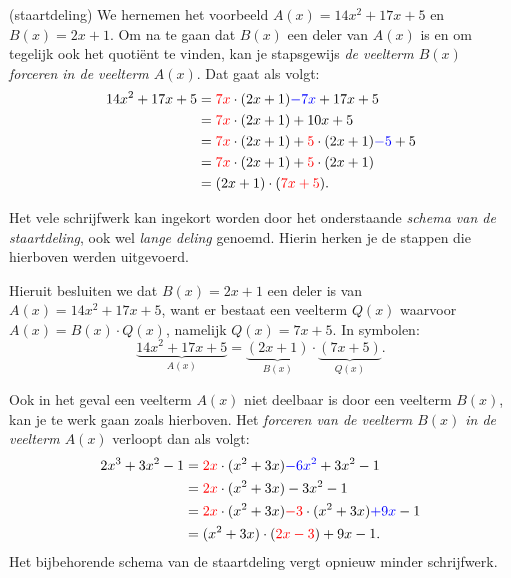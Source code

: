 \documentclass{ximera}
\begin{document}
\begin{algorithm}(staartdeling)
	We hernemen het voorbeeld $A(x) = 14x^2+17x+5$ en $B(x) = 2x+1$. Om na te gaan dat $B(x)$ een deler van $A(x)$ is en om tegelijk ook het quotiënt te vinden, kan je stapsgewijs \textit{ de veelterm $B(x)$ forceren in de veelterm $A(x)$}. Dat gaat als volgt:
	\begin{align*}
	14x^2 + 17x + 5 
	& = {\color{red}7x} \cdot (2x+1) {\color{blue}- 7x} + 17x + 5 \\
	& = {\color{red}7x} \cdot (2x+1) + 10x + 5 \\
	& = {\color{red}7x} \cdot (2x+1) + {\color{red}5} \cdot (2x+1) {\color{blue}- 5} + 5 \\
	& = {\color{red}7x} \cdot (2x+1) + {\color{red}5} \cdot (2x+1) \\
	& = (2x+1)\cdot({\color{red}7x + 5}).
	\end{align*}
	
	
	
	Het vele schrijfwerk kan ingekort worden door het onderstaande \textit{ schema van de staartdeling}, ook wel \textit{ lange deling} genoemd. Hierin herken je de stappen die hierboven werden uitgevoerd. 


	Hieruit besluiten we dat $B(x) = 2x+1$ een deler is van $A(x) = 14x^2+17x+5$, want er bestaat een veelterm $Q(x)$ waarvoor $A(x) = B(x) \cdot Q(x)$, namelijk $Q(x) = 7x+5$. In symbolen:
	\[
	\underbrace{14x^2+17x+5}_{A(x)} = \underbrace{(2x+1)}_{B(x)}\cdot\underbrace{(7x + 5)}_{Q(x)}.
	\]

	Ook in het geval een veelterm $A(x)$ niet deelbaar is door een veelterm $B(x)$, kan je te werk gaan zoals hierboven. Het \textit{ forceren van de veelterm $B(x)$ in de veelterm $A(x)$} verloopt dan als volgt:
	\begin{align*}
	2x^3 + 3x^2 - 1 
	& = {\color{red}2x} \cdot (x^2+3x) {\color{blue}- 6x^2} + 3x^2 - 1 \\
	& = {\color{red}2x} \cdot (x^2+3x) - 3x^2 - 1 \\
	& = {\color{red}2x} \cdot (x^2+3x) {\color{red}- 3} \cdot (x^2+3x) {\color{blue}+ 9x} - 1  \\
	& = (x^2+3x) \cdot ({\color{red}2x - 3}) + 9x - 1.
	\end{align*}
	Het bijbehorende schema van de staartdeling vergt opnieuw minder schrijfwerk. 


\end{algorithm}
\end{document}
